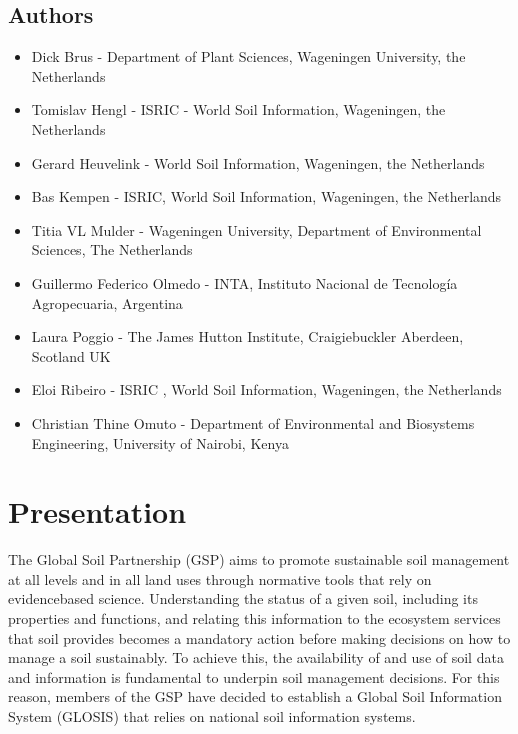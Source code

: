 \documentclass[]{book}
\providecommand{\tightlist}{%
  \setlength{\itemsep}{0pt}\setlength{\parskip}{0pt}}
\theoremstyle{definition}
\theoremstyle{definition}
\theoremstyle{definition}
\theoremstyle{remark}
\begin{document}
\section{Authors}\label{authors}

\begin{itemize}
\tightlist
\item
  Dick Brus - Department of Plant Sciences, Wageningen University, the
  Netherlands
\item
  Tomislav Hengl - ISRIC - World Soil Information, Wageningen, the
  Netherlands
\item
  Gerard Heuvelink - World Soil Information, Wageningen, the Netherlands
\item
  Bas Kempen - ISRIC, World Soil Information, Wageningen, the
  Netherlands
\item
  Titia VL Mulder - Wageningen University, Department of Environmental
  Sciences, The Netherlands
\item
  Guillermo Federico Olmedo - INTA, Instituto Nacional de Tecnología
  Agropecuaria, Argentina
\item
  Laura Poggio - The James Hutton Institute, Craigiebuckler Aberdeen,
  Scotland UK
\item
  Eloi Ribeiro - ISRIC , World Soil Information, Wageningen, the
  Netherlands
\item
  Christian Thine Omuto - Department of Environmental and Biosystems
  Engineering, University of Nairobi, Kenya
\end{itemize}

\chapter{Presentation}\label{presentation}

The Global Soil Partnership (GSP) aims to promote sustainable soil
management at all levels and in all land uses through normative tools
that rely on evidencebased science. Understanding the status of a given
soil, including its properties and functions, and relating this
information to the ecosystem services that soil provides becomes a
mandatory action before making decisions on how to manage a soil
sustainably. To achieve this, the availability of and use of soil data
and information is fundamental to underpin soil management decisions.
For this reason, members of the GSP have decided to establish a Global
Soil Information System (GLOSIS) that relies on national soil
information systems.
\end{document}

